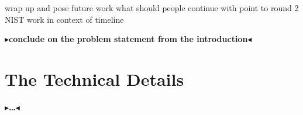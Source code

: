 \documentclass[twoside,11pt,openright]{report}
\newcommand{\todo}[1]{{\color[rgb]{.5,0,0}\textbf{$\blacktriangleright$#1$\blacktriangleleft$}}}
\begin{document}
wrap up and pose future work
what should people continue with
point to round 2 NIST
work in context of timeline

\todo{conclude on the problem statement from the introduction}


\cleardoublepage
{}




\cleardoublepage
\appendix
\chapter{The Technical Details}

\todo{\dots}
\end{document}
